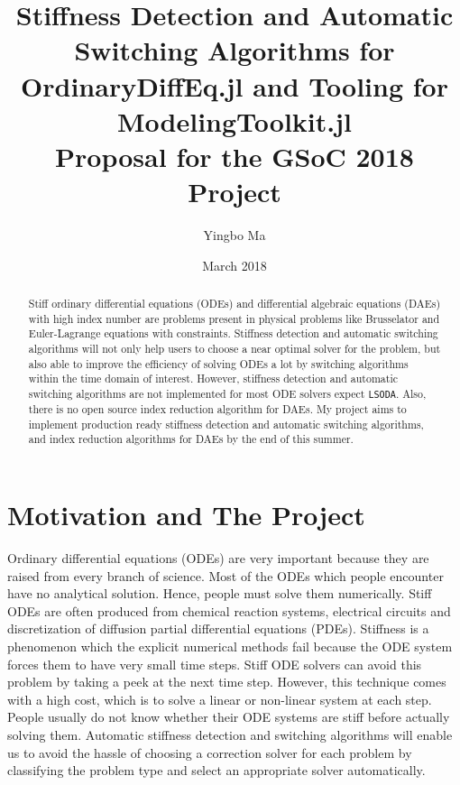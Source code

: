 \documentclass[12pt,a4paper]{article}
\author{Yingbo Ma}
\date{March 2018}
\title{Stiffness Detection and Automatic Switching Algorithms for
OrdinaryDiffEq.jl and Tooling for ModelingToolkit.jl \\
\large{Proposal for the GSoC 2018 Project}}
\begin{document}
\maketitle

\begin{abstract}
  Stiff ordinary differential equations (ODEs) and differential algebraic
  equations (DAEs) with high index number are problems present in physical
  problems like Brusselator and Euler-Lagrange equations with constraints.
  Stiffness detection and automatic switching algorithms will not only help
  users to choose a near optimal solver for the problem, but also able to
  improve the efficiency of solving ODEs a lot by switching algorithms within
  the time domain of interest. However, stiffness detection and automatic
  switching algorithms are not implemented for most ODE solvers expect
  \texttt{LSODA}. Also, there is no open source index reduction algorithm for
  DAEs. My project aims to implement production ready stiffness detection and
  automatic switching algorithms, and index reduction algorithms for DAEs by
  the end of this summer.
\end{abstract}

\section{Motivation and The Project}
Ordinary differential equations (ODEs) are very important because they are
raised from every branch of science. Most of the ODEs which people encounter
have no analytical solution. Hence, people must solve them numerically. Stiff
ODEs are often produced from chemical reaction systems, electrical circuits and
discretization of diffusion partial differential equations (PDEs). Stiffness
is a phenomenon which the explicit numerical methods fail because the ODE
system forces them to have very small time steps. Stiff ODE solvers can avoid
this problem by taking a peek at the next time step. However, this technique
comes with a high cost, which is to solve a linear or non-linear system at each
step. People usually do not know whether their ODE systems are stiff before
actually solving them. Automatic stiffness detection and switching algorithms
will enable us to avoid the hassle of choosing a correction solver for each
problem by classifying the problem type and select an appropriate solver
automatically.
\end{document}
